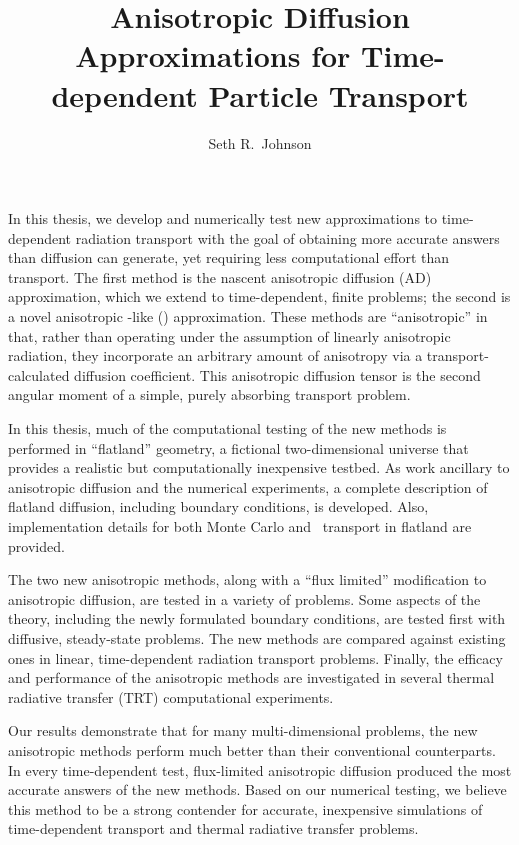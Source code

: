\documentclass{umthesis}
\author{Seth R.~Johnson}
\title{Anisotropic Diffusion Approximations for Time-dependent Particle
Transport}
\begin{document}
\begin{finalabstract}

In this thesis, we develop and numerically test new approximations to
time-dependent radiation transport with the goal of obtaining more accurate
answers than diffusion can generate, yet requiring less computational effort
than transport.
The first method is the nascent anisotropic diffusion (AD)
approximation, which we extend to time-dependent, finite problems; the
second is a novel anisotropic \Pone-like (\APone) approximation. These methods
are ``anisotropic'' in that, rather than operating under the assumption of
linearly anisotropic radiation, they incorporate an arbitrary amount of
anisotropy via a transport-calculated diffusion coefficient. This anisotropic
diffusion tensor is the second angular moment of a simple, purely
absorbing transport problem.

In this thesis, much of the computational testing of the new methods is performed in
``flatland'' geometry, a fictional two-dimensional universe that provides a
realistic but computationally inexpensive testbed. As work ancillary to
anisotropic
diffusion and the numerical experiments, a complete description
of flatland diffusion, including boundary conditions, is developed. Also,
implementation details for both Monte Carlo and \SN\ transport in
flatland are provided.

The two new anisotropic methods, along with a ``flux limited'' modification to
anisotropic diffusion, are tested in a variety of problems. Some aspects of the
theory, including the newly formulated boundary conditions, are tested first with
diffusive, steady-state problems. The new methods are compared against
existing ones in linear, time-dependent radiation transport problems. Finally,
the efficacy and performance of the anisotropic methods are investigated in
several thermal radiative transfer (TRT) computational experiments.

Our results demonstrate that for many multi-dimensional problems, the new
anisotropic methods perform much better than their conventional counterparts.
In every time-dependent test, flux-limited anisotropic diffusion produced the
most accurate answers of the new methods.
Based on our numerical testing, we believe this method to be a strong contender
for accurate, inexpensive simulations of time-dependent transport and
thermal radiative transfer problems.
\end{finalabstract}

\end{document}
